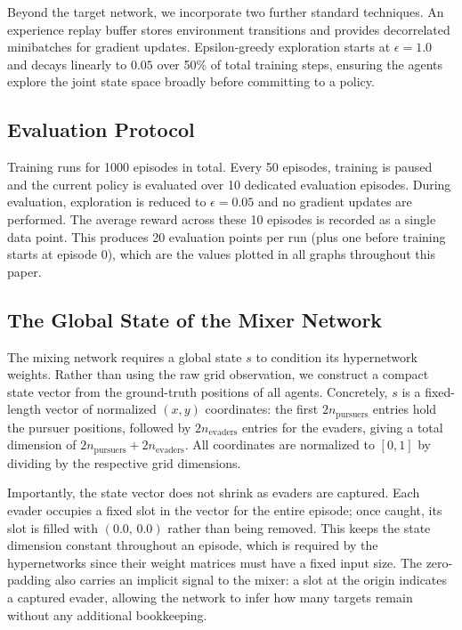 \documentclass[sigconf,screen]{acmart}
\begin{document}
Beyond the target network, we incorporate two further standard techniques. An experience replay buffer stores environment transitions and provides decorrelated minibatches for gradient updates. Epsilon-greedy exploration starts at $\epsilon = 1.0$ and decays linearly to $0.05$ over 50\% of total training steps, ensuring the agents explore the joint state space broadly before committing to a policy.

\subsection{Evaluation Protocol}

Training runs for 1000 episodes in total. Every 50 episodes, training is paused and the current policy is evaluated over 10 dedicated evaluation episodes. During evaluation, exploration is reduced to $\epsilon = 0.05$ and no gradient updates are performed. The average reward across these 10 episodes is recorded as a single data point. This produces 20 evaluation points per run (plus one before training starts at episode 0), which are the values plotted in all graphs throughout this paper.

\subsection{The Global State of the Mixer Network}

The mixing network requires a global state $s$ to condition its hypernetwork weights. Rather than using the raw grid observation, we construct a compact state vector from the ground-truth positions of all agents. Concretely, $s$ is a fixed-length vector of normalized $(x, y)$ coordinates: the first $2 n_\text{pursuers}$ entries hold the pursuer positions, followed by $2 n_\text{evaders}$ entries for the evaders, giving a total dimension of $2 n_\text{pursuers} + 2 n_\text{evaders}$. All coordinates are normalized to $[0, 1]$ by dividing by the respective grid dimensions.

Importantly, the state vector does not shrink as evaders are captured. Each evader occupies a fixed slot in the vector for the entire episode; once caught, its slot is filled with $(0.0,\, 0.0)$ rather than being removed. This keeps the state dimension constant throughout an episode, which is required by the hypernetworks since their weight matrices must have a fixed input size. The zero-padding also carries an implicit signal to the mixer: a slot at the origin indicates a captured evader, allowing the network to infer how many targets remain without any additional bookkeeping.
\end{document}
